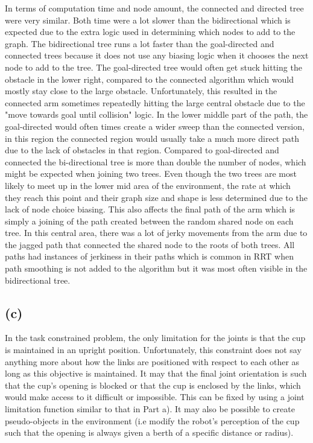 \documentclass[12pt]{article}
\newcommand{\problemPart}[1]{\subsection*{(#1)}}
\begin{document}
In terms of computation time and node amount, the connected and directed tree were very similar. Both time were a lot slower than the bidirectional which is expected due to the extra logic used in determining which nodes to add to the graph. The bidirectional tree runs a lot faster than the goal-directed and connected trees because it does not use any biasing logic when it chooses the next node to add to the tree.
The goal-directed tree would often get stuck hitting the obstacle in the lower right, compared to the connected algorithm which would mostly stay close to the large obstacle. Unfortunately, this resulted in the connected arm sometimes repeatedly hitting the large central obstacle due to the "move towards goal until collision" logic. 
In the lower middle part of the path, the goal-directed would often times create a wider sweep than the connected version, in this region the connected region would usually take a much more direct path due to the lack of obstacles in that region.
Compared to goal-directed and connected the bi-directional tree is more than double the number of nodes, which might be expected when joining two trees. Even though the two trees are most likely to meet up in the lower mid area of the environment, the rate at which they reach this point and their graph size and shape is less determined due to the lack of node choice biasing. This also affects the final path of the arm which is simply a joining of the path created between the random shared node on each tree. In this central area, there was a lot of jerky movements from the arm due to the jagged path that connected the shared node to the roots of both trees. All paths had instances of jerkiness in their paths which is common in RRT when path smoothing is not added to the algorithm but it was most often visible in the bidirectional tree.

\problemPart{c}
In the task constrained problem, the only limitation for the joints is that the cup is maintained in an upright position. Unfortunately, this constraint does not say anything more about how the links are positioned with respect to each other as long as this objective is maintained. It may that the final joint orientation is such that the cup's opening is blocked or that the cup is enclosed by the links, which would make access to it difficult or impossible. This can be fixed by using a joint limitation function similar to that in Part a). It may also be possible to create pseudo-objects in the environment (i.e  modify the robot's perception of the cup such that the opening is always given a berth of a specific distance or radius).
\end{document}
